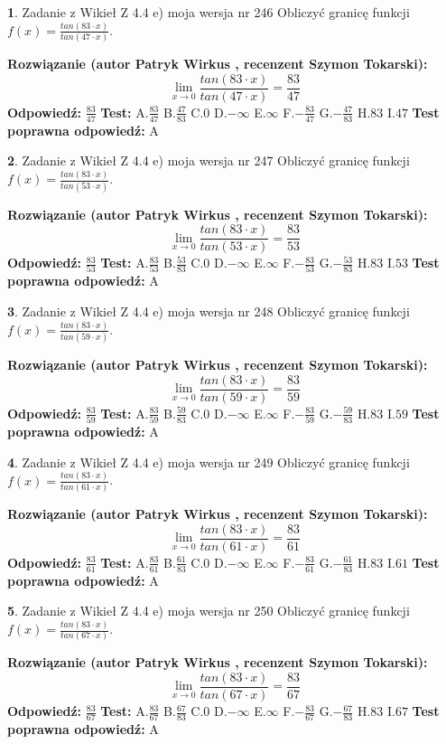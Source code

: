 \documentclass[12pt, a4paper]{article}
\theoremstyle{definition} %
\newtheorem{zad}{}
\newcommand{\zadStart}[1]{\begin{zad}#1\newline}
\newcommand{\zadStop}{\end{zad}}
\newcommand{\rozwStart}[2]{\noindent \textbf{Rozwiązanie (autor #1 , recenzent #2): }\newline}
\newcommand{\rozwStop}{\newline}
\newcommand{\odpStart}{\noindent \textbf{Odpowiedź:}\newline}
\newcommand{\odpStop}{\newline}
\newcommand{\testStart}{\noindent \textbf{Test:}\newline}
\newcommand{\testStop}{\newline}
\newcommand{\kluczStart}{\noindent \textbf{Test poprawna odpowiedź:}\newline}
\newcommand{\kluczStop}{\newline}
\begin{document}
\zadStart{Zadanie z Wikieł Z 4.4 e) moja wersja nr 246}
Obliczyć granicę funkcji $f(x)=\frac{tan(83\cdot x)}{tan(47\cdot x)}$.
\zadStop
\rozwStart{Patryk Wirkus}{Szymon Tokarski}
$$\lim\limits_{x\to 0}\frac{tan(83\cdot x)}{tan(47\cdot x)}=
\frac{83}{47}$$
\rozwStop
\odpStart
$\frac{83}{47}$
\odpStop
\testStart
A.$\frac{83}{47}$
B.$\frac{47}{83}$
C.$0$
D.$-\infty$
E.$\infty$
F.$-\frac{83}{47}$
G.$-\frac{47}{83}$
H.$83$
I.$47$
\testStop
\kluczStart
A
\kluczStop



\zadStart{Zadanie z Wikieł Z 4.4 e) moja wersja nr 247}
Obliczyć granicę funkcji $f(x)=\frac{tan(83\cdot x)}{tan(53\cdot x)}$.
\zadStop
\rozwStart{Patryk Wirkus}{Szymon Tokarski}
$$\lim\limits_{x\to 0}\frac{tan(83\cdot x)}{tan(53\cdot x)}=
\frac{83}{53}$$
\rozwStop
\odpStart
$\frac{83}{53}$
\odpStop
\testStart
A.$\frac{83}{53}$
B.$\frac{53}{83}$
C.$0$
D.$-\infty$
E.$\infty$
F.$-\frac{83}{53}$
G.$-\frac{53}{83}$
H.$83$
I.$53$
\testStop
\kluczStart
A
\kluczStop



\zadStart{Zadanie z Wikieł Z 4.4 e) moja wersja nr 248}
Obliczyć granicę funkcji $f(x)=\frac{tan(83\cdot x)}{tan(59\cdot x)}$.
\zadStop
\rozwStart{Patryk Wirkus}{Szymon Tokarski}
$$\lim\limits_{x\to 0}\frac{tan(83\cdot x)}{tan(59\cdot x)}=
\frac{83}{59}$$
\rozwStop
\odpStart
$\frac{83}{59}$
\odpStop
\testStart
A.$\frac{83}{59}$
B.$\frac{59}{83}$
C.$0$
D.$-\infty$
E.$\infty$
F.$-\frac{83}{59}$
G.$-\frac{59}{83}$
H.$83$
I.$59$
\testStop
\kluczStart
A
\kluczStop



\zadStart{Zadanie z Wikieł Z 4.4 e) moja wersja nr 249}
Obliczyć granicę funkcji $f(x)=\frac{tan(83\cdot x)}{tan(61\cdot x)}$.
\zadStop
\rozwStart{Patryk Wirkus}{Szymon Tokarski}
$$\lim\limits_{x\to 0}\frac{tan(83\cdot x)}{tan(61\cdot x)}=
\frac{83}{61}$$
\rozwStop
\odpStart
$\frac{83}{61}$
\odpStop
\testStart
A.$\frac{83}{61}$
B.$\frac{61}{83}$
C.$0$
D.$-\infty$
E.$\infty$
F.$-\frac{83}{61}$
G.$-\frac{61}{83}$
H.$83$
I.$61$
\testStop
\kluczStart
A
\kluczStop



\zadStart{Zadanie z Wikieł Z 4.4 e) moja wersja nr 250}
Obliczyć granicę funkcji $f(x)=\frac{tan(83\cdot x)}{tan(67\cdot x)}$.
\zadStop
\rozwStart{Patryk Wirkus}{Szymon Tokarski}
$$\lim\limits_{x\to 0}\frac{tan(83\cdot x)}{tan(67\cdot x)}=
\frac{83}{67}$$
\rozwStop
\odpStart
$\frac{83}{67}$
\odpStop
\testStart
A.$\frac{83}{67}$
B.$\frac{67}{83}$
C.$0$
D.$-\infty$
E.$\infty$
F.$-\frac{83}{67}$
G.$-\frac{67}{83}$
H.$83$
I.$67$
\testStop
\kluczStart
A
\kluczStop
\end{document}
